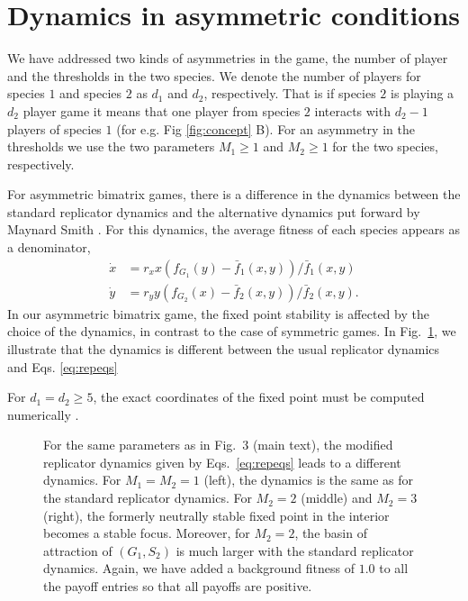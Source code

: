 \documentclass[12pt]{article}
\begin{document}
\section{Dynamics in asymmetric conditions}

We have addressed two kinds of asymmetries in the game, the number of player and the thresholds in the two species.
We denote the number of players for species $1$ and species $2$ as $d_1$ and $d_2$, respectively.
That is if species $2$ is playing a $d_2$ player game it means that one player from species $2$ interacts with $d_2-1$ players of species $1$ (for e.g.	Fig \ref{fig:concept} B).
For an asymmetry in the thresholds we use the two parameters $M_1\geq1$ and $M_2\geq1$ for the two species, respectively.

For asymmetric bimatrix games, there is a difference in the dynamics between the standard replicator dynamics and the 
alternative dynamics put forward by Maynard Smith \cite{maynard-smith:book:1982}.
For this dynamics, the average fitness of each species appears as a denominator,
\begin{align}
\dot{x} &= r_x x \left(f_{G_1}(y) -  \bar{f}_1(x,y) \right)/\bar{f}_1(x,y) \nonumber \\
\dot{y} &= r_y y \left(f_{G_2}(x) -  \bar{f}_2(x,y) \right)/\bar{f}_2(x,y).
\label{eq:repeqs}
\end{align}
In our asymmetric bimatrix game, the fixed point stability is affected by the choice of the dynamics, in contrast to the case of symmetric games. 
In Fig.\ \ref{fig:thresholdsmodrep}, we illustrate that the dynamics is different between the usual 
replicator dynamics and Eqs. \ref{eq:repeqs}

For $d_1=d_2 \geq 5$, the exact coordinates of the fixed point must be computed numerically \cite{abel:AO:1824,stewart:book:2004}.

\begin{figure}
\begin{center}
\end{center}
\caption{
For the same parameters as in Fig.\ 3 (main text), the modified replicator dynamics given by Eqs.\ \ref{eq:repeqs} leads to a different dynamics.
For $M_1=M_2=1$ (left), the dynamics is the same as for the standard replicator dynamics. 
For $M_2=2$ (middle) and $M_2=3$ (right), the formerly neutrally stable fixed point in the interior becomes a stable focus. 
Moreover, for $M_2=2$, the basin of attraction of $(G_1,S_2)$ is much larger with the standard replicator dynamics. 
Again, we have added a background fitness of $1.0$ to all the payoff entries so that all payoffs are positive.}
\label{fig:thresholdsmodrep}
\end{figure}



\end{document}
